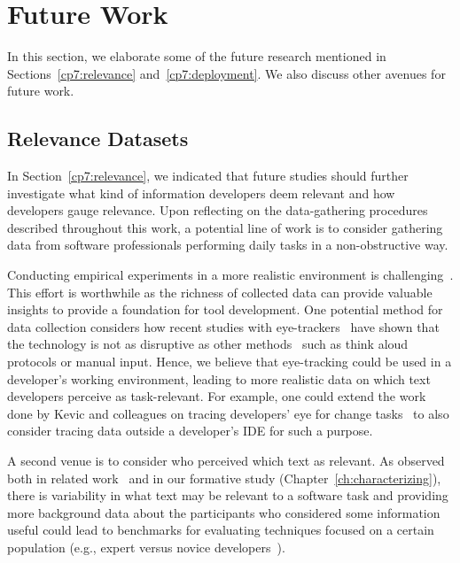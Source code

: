 \section{Future Work}
\label{cp7:future-work}



In this section, we elaborate some of the future research  
mentioned in Sections~\ref{cp7:relevance} and~\ref{cp7:deployment}.
We also discuss other avenues for future work.


\subsection{Relevance Datasets}
\label{cp7:gauging}


In Section~\ref{cp7:relevance}, we indicated that future studies should further investigate 
what kind of information developers deem relevant and how developers gauge relevance.
Upon reflecting on the data-gathering procedures described throughout this work,
a potential line of work is to consider 
gathering data from software professionals performing daily tasks in a non-obstructive way.



Conducting empirical
 experiments in a more realistic environment is challenging~\cite{Kevic2015}.
This effort is worthwhile as
the richness of collected data can provide valuable insights
to provide a foundation for tool development.
One potential method for
data collection 
considers 
how recent studies with eye-trackers~\cite{Cutrell2007, Petrusel2013, sharafi2020}
have shown that the technology is not as disruptive as other 
methods~\cite{Lazar2017} such as think aloud protocols or manual input. 
Hence, we believe that eye-tracking 
could be used in a developer's working environment, 
leading to more realistic data on which text developers perceive as task-relevant.
For example, one could
extend the work done by Kevic and colleagues on
tracing developers' eye for change tasks~\cite{Kevic2015} to
also consider tracing data outside a developer's IDE
for such a purpose.



A second venue is to consider who perceived which text as relevant.
As observed both in related work~\cite{Crosby1990, Busjahn2015} and in our formative study (Chapter~\ref{ch:characterizing}),
there is variability in what text may be relevant to a software task and 
providing more background data about 
the participants who considered some information useful could lead to benchmarks 
for evaluating techniques
focused on a certain population (e.g., expert versus novice developers~\cite{Crosby1990, Busjahn2015}). 



